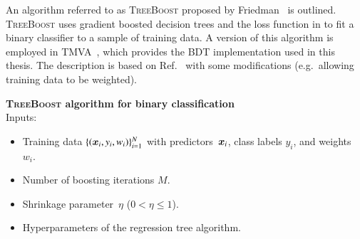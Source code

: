 


An algorithm referred to as \textsc{TreeBoost} proposed by
Friedman~\cite{Friedman:2001wbq} is outlined. \textsc{TreeBoost} uses gradient
boosted decision trees and the loss function in  to fit
a binary classifier to a sample of training data. A version of this algorithm is
employed in \textsc{TMVA}~\cite{TMVA}, which provides the BDT implementation
used in this thesis. The description is based on Ref.~\cite{Friedman:2001wbq}
with some modifications (e.g.\ allowing training data to be weighted).

\vspace{11pt}
\noindent\textbf{\textsc{TreeBoost} algorithm for binary classification} \\[11pt]
\noindent Inputs:
\begin{itemize}[itemsep=2pt]
\item Training data $\{(\bm{x}_i, y_i, w_i)\}_{i = 1}^{N}$ with
  predictors~$\bm{x}_i$, class labels $y_i$, and weights~$w_i$.
\item Number of boosting iterations $M$.
\item Shrinkage parameter~$\eta$ ($0 < \eta \leq 1$).
\item Hyperparameters of the regression tree algorithm.
\end{itemize}

